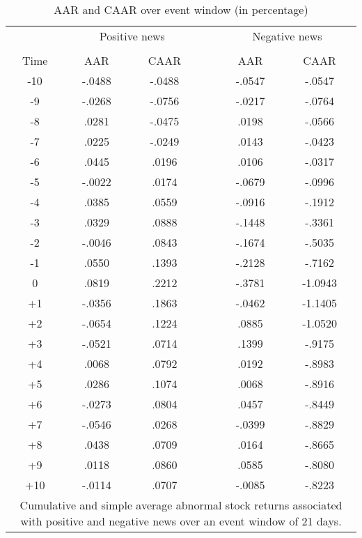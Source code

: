 \begin{table}[ht]
\centering
\begin{tabular}{cccccc}
  \hline
   & \multicolumn{2}{c}{Positive news} & \multicolumn{1}{p{1.5cm}}{} & \multicolumn{2}{c}{Negative news}  \\ \cline{2-3} \cline{5-6}
   \\
  Time & AAR & CAAR & & AAR & CAAR \\   
 \hline
-10 & -.0488 & -.0488 & & -.0547 & -.0547 \\ 
  -9 & -.0268 & -.0756 & & -.0217 & -.0764 \\ 
  -8 & .0281 & -.0475 & & .0198 & -.0566 \\ 
  -7 & .0225 & -.0249 & & .0143 & -.0423 \\ 
  -6 & .0445 & .0196 & & .0106 & -.0317 \\ 
  -5 & -.0022 & .0174 & & -.0679 & -.0996 \\ 
  -4 & .0385 & .0559 & & -.0916 & -.1912 \\ 
  -3 & .0329 & .0888 & &-.1448 & -.3361 \\ 
  -2 & -.0046 & .0843 & & -.1674 & -.5035 \\ 
  -1 & .0550 & .1393 & & -.2128 & -.7162 \\ 
  0 & .0819 & .2212 & &-.3781 & -1.0943 \\ 
  +1 & -.0356 & .1863 & & -.0462 & -1.1405 \\ 
  +2 & -.0654 & .1224 & & .0885 & -1.0520 \\ 
  +3 & -.0521 & .0714 & & .1399 & -.9175 \\ 
  +4 & .0068 & .0792 & & .0192 & -.8983 \\ 
  +5 & .0286 & .1074 & & .0068 & -.8916 \\ 
  +6 & -.0273 & .0804 & & .0457 & -.8449 \\ 
  +7 & -.0546 & .0268 & & -.0399 & -.8829 \\ 
  +8 & .0438 & .0709 & & .0164 & -.8665 \\ 
  +9 & .0118 & .0860 & & .0585 & -.8080 \\ 
  +10 & -.0114 & .0707 & & -.0085 & -.8223 \\ 
   \hline \hline
   \multicolumn{6}{p{10cm}}{\footnotesize Cumulative and simple average abnormal stock returns associated with positive and negative news over an event window of 21 days.} \\
   \hline
\end{tabular}
\caption{AAR and CAAR over event window (in percentage)} 
\end{table}

